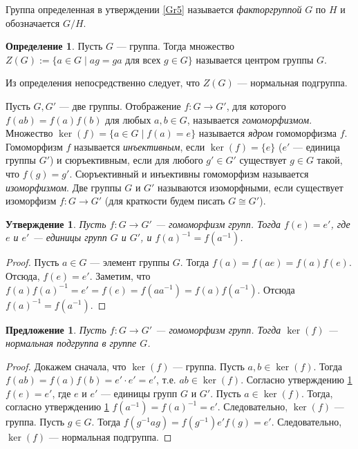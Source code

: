 \documentclass[12pt, titlepage, oneside]{amsbook}
\newtheorem{proposition}[theorem]{Предложение}
\newtheorem{claim}[theorem]{Утверждение}
\theoremstyle{definition}
\newtheorem{definition}[theorem]{Определение}
\theoremstyle{remark}
\begin{document}
Группа определенная в утверждении \ref{Gr5} называется
\emph{факторгруппой} $G$ по $H$ и обозначается $G/H$.

\begin{definition}
	Пусть $G$ --- группа. Тогда множество $Z(G):=\{a\in G\mid ag=ga
		\text{ для всех } g\in G\}$ называется центром группы $G$.
\end{definition}

Из определения непосредственно следует, что $Z(G)$ --- нормальная
подгруппа.

Пусть $G, G'$ --- две группы. Отображение $f\colon G\rightarrow G'$,
для которого $f(ab)=f(a)f(b)$ для любых $a, b\in G$, называется
\emph{гомоморфизмом}. Множество $\ker(f)=\{a\in G\mid f(a)=e\}$
называется \emph{ядром} гомоморфизма $f$. Гомоморфизм $f$ называется
\emph{инъективным}, если $\ker(f)=\{e\}$ ($e'$ --- единица группы $G'$) и сюръективным, если для
любого $g'\in G'$ существует $g\in G$ такой, что $f(g)=g'$.
Сюръективный и инъективны гомоморфизм называется
\emph{изоморфизмом}. Две группы $G$ и $G'$ называются изоморфными,
если существует изоморфизм $f:G\rightarrow G'$ (для краткости будем
писать $G\cong G'$).

\begin{claim}
	\label{GomGr1} Пусть $f\colon G\rightarrow G'$ --- гомоморфизм
	групп. Тогда $f(e)=e'$, где $e$ и $e'$ --- единицы групп $G$ и $G'$,
	и $f(a)^{-1}=f(a^{-1})$.
\end{claim}

\begin{proof}
	Пусть $a\in G$ --- элемент группы $G$. Тогда $f(a)=f(ae)=f(a)f(e)$.
	Отсюда, $f(e)=e'$. Заметим, что
	$f(a)f(a)^{-1}=e'=f(e)=f(aa^{-1})=f(a)f(a^{-1})$. Отсюда
	$f(a)^{-1}=f(a^{-1})$.
\end{proof}

\begin{proposition}
	\label{GomGr2}
	Пусть $f\colon G\rightarrow G'$ --- гомоморфизм групп. Тогда
	$\ker(f)$ --- нормальная подгруппа в группе $G$.
\end{proposition}

\begin{proof}
	Докажем сначала, что $\ker(f)$ --- группа. Пусть $a,b\in\ker(f)$. Тогда $f(ab)=f(a)f(b)=e'\cdot e'=e'$, т.е. $ab\in\ker(f)$. Согласно утверждению
	\ref{GomGr1} $f(e)=e'$, где $e$ и $e'$ --- единицы групп $G$ и $G'$.
	Пусть $a\in\ker(f)$. Тогда, согласно утверждению \ref{GomGr1}
	$f(a^{-1})=f(a)^{-1}=e'$. Следовательно, $\ker(f)$ --- группа. Пусть
	$g\in G$. Тогда $f(g^{-1}ag)=f(g^{-1})e'f(g)=e'$. Следовательно,
	$\ker(f)$ --- нормальная подгруппа.
\end{proof}
\end{document}
